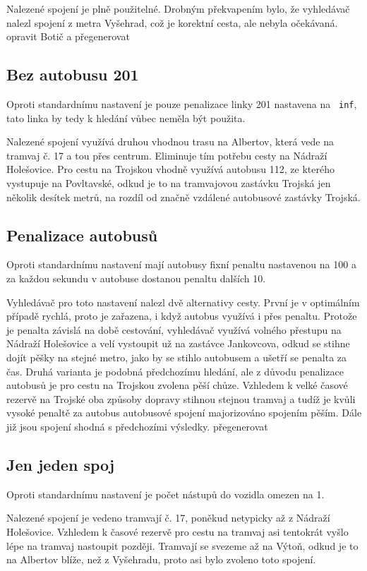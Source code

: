 Nalezené spojení je plně použitelné. Drobným překvapením bylo, že vyhledávač
nalezl spojení z metra Vyšehrad, což je korektní cesta, ale nebyla očekávaná.
\TODO opravit Botič a přegenerovat
\subsection{Bez autobusu 201}
Oproti standardnímu nastavení je pouze penalizace linky 201 nastavena na {\tt
inf}, tato linka by tedy k hledání vůbec neměla být použita.

Nalezené spojení využívá druhou vhodnou trasu na Albertov, která vede na tramvaj
č. 17 a tou přes centrum. Eliminuje tím potřebu cesty na Nádraží Holešovice.
Pro cestu na Trojskou vhodně využívá autobusu 112, ze kterého vystupuje na
Povltavské, odkud je to na tramvajovou zastávku Trojská jen několik desítek
metrů, na rozdíl od značně vzdálené autobusové zastávky Trojská.

\subsection{Penalizace autobusů}
Oproti standardnímu nastavení mají autobusy fixní penaltu nastavenou na 100 a za
každou sekundu v autobuse dostanou penaltu dalších 10. 

Vyhledávač pro toto nastavení nalezl dvě alternativy cesty. První je v
optimálním případě rychlá, proto je zařazena, i když autobus využívá i přes
penaltu. Protože je penalta závislá na době cestování, vyhledávač využívá
volného přestupu na Nádraží Holešovice a velí vystoupit už na zastávce
Jankovcova, odkud se stihne dojít pěšky na stejné metro, jako by se stihlo
autobusem a ušetří se penalta za čas. Druhá varianta je podobná předchozímu
hledání, ale z důvodu penalizace autobusů je pro cestu na Trojskou zvolena pěší
chůze. Vzhledem k velké časové rezervě na Trojské oba způsoby dopravy stihnou
stejnou tramvaj a tudíž je kvůli vysoké penaltě za autobus autobusové spojení
majorizováno spojením pěším. Dále již jsou spojení shodná s předchozími
výsledky.
\TODO přegenerovat

\subsection{Jen jeden spoj}
Oproti standardnímu nastavení je počet nástupů do vozidla omezen na 1.

Nalezené spojení je vedeno tramvají č. 17, poněkud netypicky až z Nádraží
Holešovice. Vzhledem k časové rezervě pro cestu na tramvaj asi tentokrát vyšlo
lépe na tramvaj nastoupit později. Tramvají se svezeme až na Výtoň, odkud je to
na Albertov blíže, než z Vyšehradu, proto asi bylo zvoleno toto spojení. 
